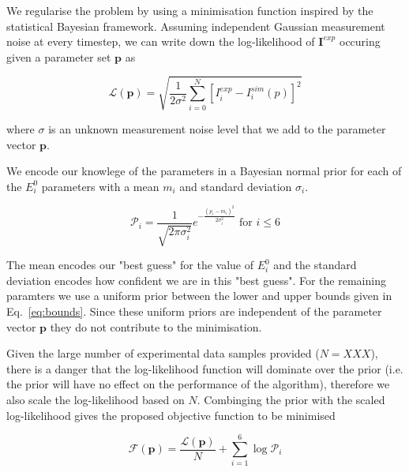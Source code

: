 \documentclass[a4paper, 12pt]{article}
\begin{document}
We regularise the problem by using a minimisation function inspired by the
statistical Bayesian framework. Assuming independent Gaussian measurement noise
at every timestep, we can write down the log-likelihood of $\mathbf{I}^{exp}$
occuring given a parameter set $\mathbf{p}$ as

\begin{equation}
    \mathcal{L}(\mathbf{p}) = \sqrt{\frac{1}{2 \sigma^2} \sum_{i=0}^{N} [I^{exp}_i-I^{sim}_i(p)]^2}
\end{equation}

where $\sigma$ is an unknown measurement noise level that we add to the
parameter vector $\mathbf{p}$.

We encode our knowlege of the parameters in a Bayesian normal prior for each of
the $E^0_i$ parameters with a mean $m_i$ and standard deviation $\sigma_i$. 

\begin{equation}
    \mathcal{P}_i = \frac{1}{\sqrt{2 \pi \sigma_i^2}} e^{-\frac{(p_i-m_i)^2}{2 \sigma_i^2}} \text{      for } i \le 6
\end{equation}

The mean encodes our "best guess" for the value of $E^0_i$ and the standard
deviation encodes how confident we are in this "best guess". For the remaining
paramters we use a uniform prior between the lower and upper bounds given in
Eq.~\ref{eq:bounds}. Since these uniform priors are independent of the parameter vector $\mathbf{p}$ they do not contribute to the minimisation. 

Given the large number of experimental data samples provided ($N = XXX$), there
is a danger that the log-likelihood function will dominate over the prior (i.e.
the prior will have no effect on the performance of the algorithm), therefore we
also scale the log-likelihood based on $N$. Combinging the prior with the scaled
log-likelihood gives the proposed objective function to be minimised

\begin{equation}\label{eq:objective}
    \mathcal{F}(\mathbf{p}) =  \frac{\mathcal{L}(\mathbf{p})}{N} + 
    \sum_{i=1}^6 \log \mathcal{P}_i
\end{equation}
\end{document}

